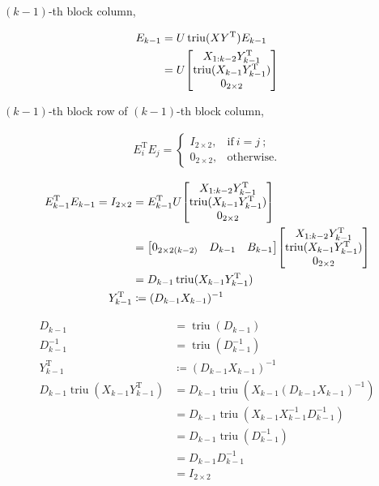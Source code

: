 \documentclass[11pt]{article}
\newcommand{\triu}{\mathop{\mathrm{triu}}}
\newcommand{\T}{\mathrm{T}}
\begin{document}
$(k-1)$-th block column, 

\begin{align*}
    E_{k-1} &= U \triu(XY^{\T})E_{k-1} \\
    &= U \mqty[
        X_{1:k-2}Y_{k-1}^{\T} \\
        \triu(X_{k-1}Y_{k-1}^{\T}) \\
        0_{2 \times 2}
        ]
\end{align*}

$(k-1)$-th block row of $(k-1)$-th block column, 

\begin{align*}
    E_{i}^{\T} E_{j} = 
    \begin{cases}
        I_{2 \times 2}, & \text{if} \ i=j \ ;\\
        0_{2 \times 2}, & \text{otherwise}.
    \end{cases} 
\end{align*}

\begin{align*}
    E_{k-1}^{\T} E_{k-1} = I_{2 \times 2} &= E_{k-1}^{\T} U \mqty[
        X_{1:k-2}Y_{k-1}^{\T} \\
        \triu(X_{k-1}Y_{k-1}^{\T}) \\
        0_{2 \times 2}
        ] \\
        &= \mqty[
            0_{2 \times 2(k-2)} & D_{k-1} & B_{k-1}
        ] \mqty[
            X_{1:k-2}Y_{k-1}^{\T} \\
            \triu(X_{k-1}Y_{k-1}^{\T}) \\
            0_{2 \times 2}
            ] \\
        & = D_{k-1} \triu(X_{k-1}Y_{k-1}^{\T}) \\
    Y_{k-1}^{\T} &\coloneqq (D_{k-1} X_{k-1})^{-1}
\end{align*}

\begin{align*}
    D_{k-1} &= \triu(D_{k-1})\\
    D_{k-1}^{-1} &= \triu(D_{k-1}^{-1})\\
    Y_{k-1}^{\T} &\coloneqq (D_{k-1} X_{k-1})^{-1}\\
    D_{k-1} \triu(X_{k-1}Y_{k-1}^{\T}) &= D_{k-1} \triu(X_{k-1}(D_{k-1} X_{k-1})^{-1})\\
        &= D_{k-1} \triu(X_{k-1} X_{k-1}^{-1} D_{k-1}^{-1})\\
        &= D_{k-1} \triu(D_{k-1}^{-1})\\
        &= D_{k-1} D_{k-1}^{-1}\\
        &= I_{2 \times 2}
\end{align*}
\end{document}
